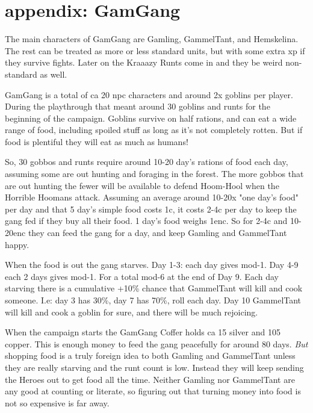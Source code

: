 \newpage
\section*{appendix: GamGang}

\raggedbottom

The main characters of GamGang are Gamling, GammelTant, and Hemskelina. The rest can be treated as more or less standard units, but with some extra xp if they survive fights. Later on the Kraaazy Runts come in and they be weird non-standard as well.

GamGang is a total of ca 20 npc characters and around 2x goblins per player. During the playthrough that meant around 30 goblins and runts for the beginning of the campaign. Goblins survive on half rations, and can eat a wide range of food, including spoiled stuff as long as it's not completely rotten. But if food is plentiful they will eat as much as humans!

So, 30 gobbos and runts require around 10-20 day's rations of food each day, assuming some are out hunting and foraging in the forest. The more gobbos that are out hunting the fewer will be available to defend Hoom-Hool when the Horrible Hoomans attack.
Assuming an average around 10-20x "one day's food" per day and that 5 day's simple food costs 1c, it costs 2-4c per day to keep the gang fed if they buy all their food. 1 day's food weighs 1enc. So for 2-4c and 10-20enc they can feed the gang for a day, and keep Gamling and GammelTant happy.

When the food is out the gang starves. Day 1-3: each day gives mod-1. Day 4-9 each 2 days gives mod-1. For a total mod-6 at the end of Day 9.
Each day starving there is a cumulative +10\% chance that GammelTant will kill and cook someone. I.e: day 3 has 30\%, day 7 has 70\%, roll each day.
Day 10 GammelTant will kill and cook a goblin for sure, and there will be much rejoicing.

When the campaign starts the GamGang Coffer holds ca 15 silver and 105 copper. This is enough money to feed the gang peacefully for around 80 days. \emph{But} shopping food is a truly foreign idea to both Gamling and GammelTant unless they are really starving and the runt count is low. Instead they will keep sending the Heroes out to get food all the time. Neither Gamling nor GammelTant are any good at counting or literate, so figuring out that turning money into food is not so expensive is far away.

